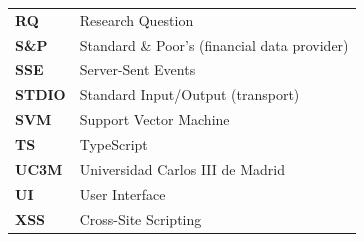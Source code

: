 \begin{table}[H]
\begin{tabular}{p{2.8cm}p{11.5cm}}
\textbf{RQ} & Research Question \\
\textbf{S\&P} & Standard \& Poor's (financial data provider) \\
\textbf{SSE} & Server-Sent Events \\
\textbf{STDIO} & Standard Input/Output (transport) \\
\textbf{SVM} & Support Vector Machine \\
\textbf{TS} & TypeScript \\
\textbf{UC3M} & Universidad Carlos III de Madrid \\
\textbf{UI} & User Interface \\
\textbf{XSS} & Cross-Site Scripting \\
\end{tabular}
\end{table}
